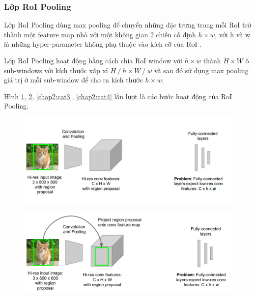 \subsubsection{Lớp RoI Pooling}
Lớp RoI Pooling dùng max pooling để chuyển những đặc trưng trong mỗi RoI trở thành một feature map nhỏ với một không gian 2 chiều cố định $h \times w$, với h và w là những hyper-parameter không phụ thuộc vào kích cỡ của RoI \cite{girshick2015fast}.

Lớp RoI Pooling hoạt động bằng cách chia RoI window với $h \times w$ thành  $H \times W$ ô sub-windows với kích thước xấp xỉ $H\mathbin{/}h \times W\mathbin{/}w$ và sau đó sử dụng max pooling giá trị ở mỗi sub-window để cho ra kích thước $h \times w$.

Hình \ref{chap2:cat1}, \ref{chap2:cat2}, \ref{chap2:cat3}, \ref{chap2:cat4} lần lượt là các bước hoạt động của RoI Pooling.
\begin{center}
    \begin{figure}[H]
    \centering
    \includegraphics[width=0.8\columnwidth]{images/chap2/fastRCNN_1.png}
    \label{chap2:cat1}
    \end{figure}
\end{center}
\begin{center}
    \begin{figure}[H]
    \centering
    \includegraphics[width=0.8\columnwidth]{images/chap2/fastRCNN_2.png}
    \label{chap2:cat2}
    \end{figure}
\end{center}
